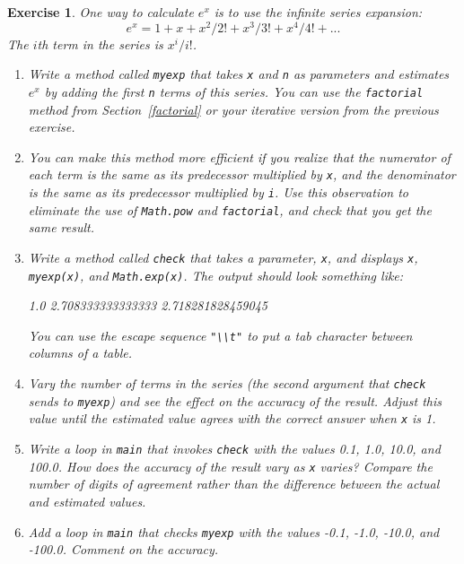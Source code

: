\documentclass[12pt]{book}
\theoremstyle{exercise}
\newtheorem{exercise}{Exercise}[chapter]
\newcommand{\java}[1]{\verb"#1"}
\begin{document}
\begin{exercise}

One way to calculate $e^x$ is to use the infinite series expansion:
%
\[ e^x = 1 + x + x^2 / 2! + x^3 / 3! + x^4 / 4! + ... \]
%
The $i$th term in the series is $x^i / i!$.

\begin{enumerate}

\item Write a method called \java{myexp} that takes \java{x} and \java{n} as parameters and estimates $e^x$ by adding the first \java{n} terms of this series.
You can use the \java{factorial} method from Section~\ref{factorial} or your iterative version from the previous exercise.

\item You can make this method more efficient if you realize that the numerator of each term is the same as its predecessor multiplied by \java{x}, and the denominator is the same as its predecessor multiplied by \java{i}.
Use this observation to eliminate the use of \java{Math.pow} and \java{factorial}, and check that you get the same result.

\item Write a method called \java{check} that takes a parameter, \java{x}, and displays \java{x}, \java{myexp(x)}, and \java{Math.exp(x)}.
The output should look something like:

\begin{stdout}
1.0     2.708333333333333     2.718281828459045
\end{stdout}

You can use the escape sequence \verb|"\\t"| to put a tab character between columns of a table.

\item Vary the number of terms in the series (the second argument that \java{check} sends to \java{myexp}) and see the effect on the accuracy of the result.
Adjust this value until the estimated value agrees with the correct answer when \java{x} is 1.

\item Write a loop in \java{main} that invokes \java{check} with the values 0.1, 1.0, 10.0, and 100.0.
How does the accuracy of the result vary as \java{x} varies?
Compare the number of digits of agreement rather than the difference between the actual and estimated values.

\item Add a loop in \java{main} that checks \java{myexp} with the values -0.1, -1.0, -10.0, and -100.0.
Comment on the accuracy.

\end{enumerate}

\end{exercise}
\end{document}
